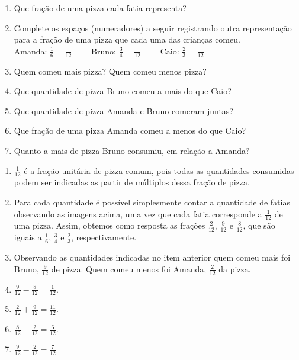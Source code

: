 \documentclass[10 pt,usenames,dvipsnames, oneside]{article}
\begin{document}
\begin{enumerate}
\item  Que fração de uma pizza cada fatia representa?
 \item Complete os espaços (numeradores) a seguir registrando outra representação para a fração de uma pizza que cada uma das crianças comeu.\\ Amanda: $\frac{1}{6} =\frac{}{12}  \quad \quad$ Bruno: $\frac{3}{4} =\frac{}{12} \quad \quad$ Caio: $\frac{2}{3} =\frac{}{12}$
 \item Quem comeu mais pizza? Quem comeu menos pizza?
 \item Que quantidade de pizza Bruno comeu a mais do que Caio?
 \item Que quantidade de pizza Amanda e Bruno comeram juntas?
  \item Que fração de uma pizza Amanda comeu a menos do que Caio?
  \item Quanto a mais de pizza Bruno consumiu, em relação a Amanda?
\end{enumerate}

\ifdefined\prof
\begin{solucao}

\begin{enumerate}
\item $\frac{1}{12}$ é a fração unitária de pizza comum, pois todas as quantidades consumidas podem ser indicadas as partir de múltiplos dessa fração de pizza.
   \item Para cada quantidade é possível simplesmente contar a quantidade de fatias observando as imagens acima, uma vez que cada fatia corresponde a $\frac{1}{12}$ de uma pizza. Assim, obtemos como resposta as frações $\frac{2}{12}$, $\frac{9}{12}$ e $\frac{8}{12}$, que são iguais a $\frac{1}{6}$, $\frac{3}{4}$ e $\frac{2}{3}$, respectivamente.
   \item  Observando as quantidades indicadas no item anterior quem comeu mais foi Bruno, $\frac{9}{12}$ de pizza. Quem comeu menos foi Amanda, $\frac{2}{12}$ da pizza.
   \item  $\frac{9}{12} -  \frac{8}{12} = \frac{1}{12}$.
   \item  $\frac{2}{12} +  \frac{9}{12} = \frac{11}{12}$.
   \item  $\frac{8}{12} -  \frac{2}{12} = \frac{6}{12}$.
   \item  $\frac{9}{12} -  \frac{2}{12} = \frac{7}{12}$
\end{enumerate}

\end{solucao}
\clearpage

\pagestyle{empty}
\begin{center}
\null\vfill
{}
\vfill\null
\end{center}
\fi
\end{document}
